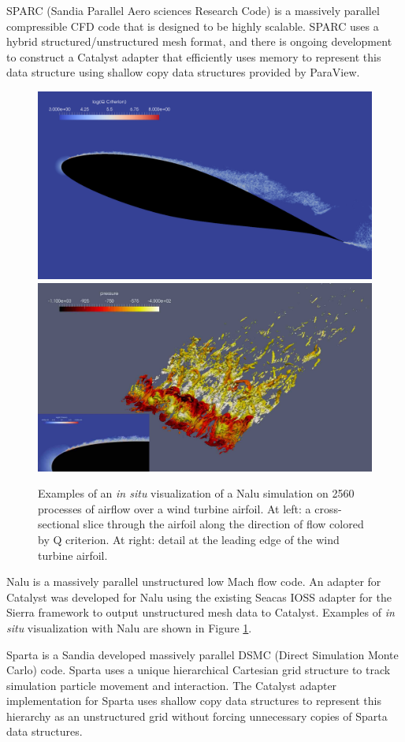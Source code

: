 SPARC (Sandia Parallel Aero sciences Research Code) \cite{SPARC} is a massively parallel compressible CFD code that is designed to be highly scalable.
SPARC uses a hybrid structured/unstructured mesh format, and there is ongoing development to construct a Catalyst adapter that efficiently uses memory to represent this data structure using shallow copy data structures provided by ParaView.

\begin{figure}[t]
  \centering
  \includegraphics[width=.49\linewidth]{projects/2.3.4-DataViz/2.3.4.04-SNL-ATDM-DataViz/SNL-ATDM-Nalu-Slice}
  \hfill
  \includegraphics[width=.49\linewidth]{projects/2.3.4-DataViz/2.3.4.04-SNL-ATDM-DataViz/SNL-ATDM-Nalu-Leading}
  \caption{
    Examples of an \emph{in situ} visualization of a Nalu simulation on 2560 processes of airflow over a wind turbine airfoil.
    At left: a cross-sectional slice through the airfoil along the direction of flow colored by Q criterion.
    At right: detail at the leading edge of the wind turbine airfoil.
  }
  \label{fig:SNL-ATDM-Vis-Nalu}
\end{figure}

Nalu \cite{Nalu} is a massively parallel unstructured low Mach flow code.
An adapter for Catalyst was developed for Nalu using the existing Seacas IOSS adapter for the Sierra framework to output unstructured mesh data to Catalyst.
Examples of \emph{in situ} visualization with Nalu are shown in Figure \ref{fig:SNL-ATDM-Vis-Nalu}.

Sparta \cite{Sparta} is a Sandia developed massively parallel DSMC (Direct Simulation Monte Carlo) code.
Sparta uses a unique hierarchical Cartesian grid structure to track simulation particle movement and interaction.
The Catalyst adapter implementation for Sparta uses shallow copy data structures to represent this hierarchy as an unstructured grid without forcing unnecessary copies of Sparta data structures.

